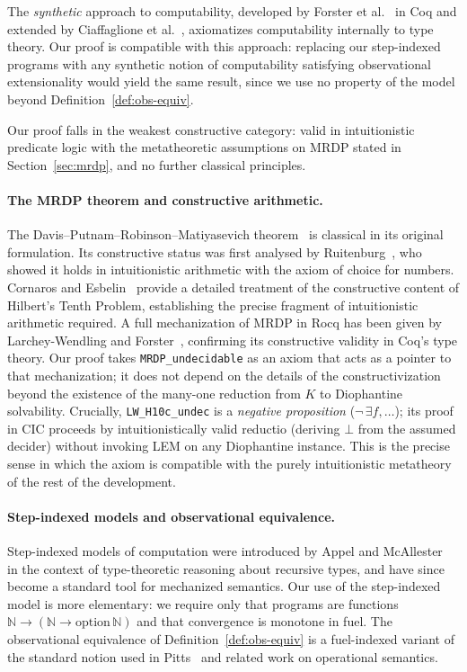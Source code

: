 \documentclass{lmcs}
\begin{document}
The \emph{synthetic} approach to computability, developed by
Forster et al.~\cite{forster2019} in Coq and extended by
Ciaffaglione et al.~\cite{ciaffaglione2004}, axiomatizes computability
internally to type theory.  Our proof is compatible with this approach:
replacing our step-indexed programs with any synthetic notion of
computability satisfying observational extensionality would yield the
same result, since we use no property of the model beyond
Definition~\ref{def:obs-equiv}.

Our proof falls in the weakest constructive category: valid in
intuitionistic predicate logic with the metatheoretic assumptions on
MRDP stated in Section~\ref{sec:mrdp}, and no further classical principles.

\paragraph{The MRDP theorem and constructive arithmetic.}
The Davis--Putnam--Robinson--Matiyasevich theorem~\cite{davis1961,matiyasevich1970}
is classical in its original formulation. Its constructive status was first
analysed by Ruitenburg~\cite{ruitenburg1985}, who showed it holds in
intuitionistic arithmetic with the axiom of choice for numbers. Cornaros
and Esbelin~\cite{cornaros1998} provide a detailed treatment of the
constructive content of Hilbert's Tenth Problem, establishing the precise
fragment of intuitionistic arithmetic required. A full mechanization of
MRDP in Rocq has been given by Larchey-Wendling and
Forster~\cite{larchey2022}, confirming its constructive validity in Coq's
type theory. Our proof takes \texttt{MRDP\_undecidable} as an axiom that
acts as a pointer to that mechanization; it does not depend on the details
of the constructivization beyond the existence of the many-one reduction
from $K$ to Diophantine solvability.
Crucially, \texttt{LW\_H10c\_undec} is a \emph{negative proposition}
($\neg\,\exists f, \ldots$); its proof in CIC proceeds by
intuitionistically valid reductio (deriving $\bot$ from the assumed
decider) without invoking LEM on any Diophantine instance.
This is the precise sense in which the axiom is compatible with
the purely intuitionistic metatheory of the rest of the development.

\paragraph{Step-indexed models and observational equivalence.}
Step-indexed models of computation were introduced by Appel and
McAllester~\cite{appel2001} in the context of type-theoretic reasoning about
recursive types, and have since become a standard tool for mechanized
semantics. Our use of the step-indexed model is more elementary: we require
only that programs are functions $\mathbb{N} \to (\mathbb{N} \to
\text{option}\,\mathbb{N})$ and that convergence is monotone in fuel. The
observational equivalence of Definition~\ref{def:obs-equiv} is a
fuel-indexed variant of the standard notion used in Pitts~\cite{pitts2000}
and related work on operational semantics.
\end{document}
